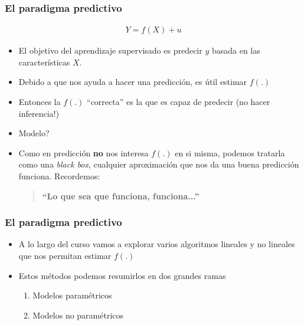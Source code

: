 \documentclass[
  shownotes,
  xcolor={svgnames},
  hyperref={colorlinks,citecolor=DarkBlue,linkcolor=DarkRed,urlcolor=DarkBlue}
  , aspectratio=169]{beamer}
\begin{document}
\begin{frame}
\frametitle{El paradigma predictivo}



\begin{align}
Y=f(X)+u
\end{align}

\begin{itemize}
  \item El objetivo del aprendizaje supervisado es predecir $y$ basada en las características $X$.
  \medskip
  
  
  \item Debido a que nos ayuda a hacer una predicción, es útil estimar $f(.)$
  \medskip
  \item Entonces la  $f(.)$ ``correcta'' es la que es capaz de predecir (no hacer inferencia!)
  \medskip
  \item Modelo?
  \pause
  \item Como en predicción {\bf no} nos interesa $f(.)$ en si misma, podemos tratarla como una {\it black box}, cualquier aproximación que nos da una buena predicción funciona. Recordemos:

\pause
  \begin{quote}
  \centering
  \bf ``Lo que sea que funciona, funciona...''
  \end{quote}
\end{itemize}



\end{frame}


\begin{frame}
\frametitle{El paradigma predictivo}

\begin{itemize}

  \item A lo largo del curso vamos a explorar varios algoritmos lineales y no lineales que nos permitan estimar $f(.)$
  \medskip
  \item Estos métodos podemos resumirlos  en dos grandes ramas
  \medskip
  \begin{enumerate}
    \item Modelos paramétricos
    \medskip
    \item Modelos no paramétricos
  \end{enumerate}

\end{itemize}


\end{frame}
\end{document}
